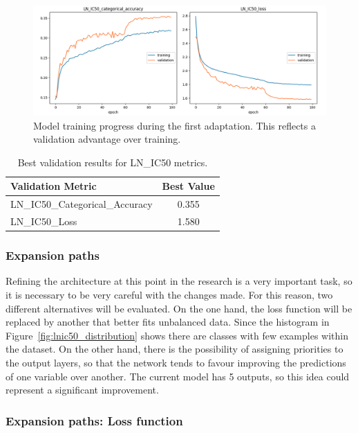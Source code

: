 \begin{figure}[H]
    \centering
    \includegraphics[width=1\textwidth]{figures/neural_net_classification/classification_mse_v1.png}
    \caption{Model training progress during the first adaptation. This reflects a validation advantage over training.}
    \label{fig:train_class_net_v1}
\end{figure}

\begin{table}[H]
    \centering
    \begin{tabular}{|l|c|}
    \hline
    \textbf{Validation Metric} & \textbf{Best Value} \\
    \hline
    LN\_IC50\_Categorical\_Accuracy & 0.355 \\
    LN\_IC50\_Loss & 1.580 \\
    \hline
    \end{tabular}
    \caption{Best validation results for LN\_IC50 metrics.}
    \label{tab:best_val_ln_ic50_metrics_net_class_v1}
\end{table}

\subsubsection{Expansion paths}

Refining the architecture at this point in the research is a very important task, so it is necessary to be very careful with the changes made. For this reason, two different alternatives will be evaluated. On the one hand, the loss function will be replaced by another that better fits unbalanced data. Since the histogram in Figure~\ref{fig:lnic50_distribution} shows there are classes with few examples within the dataset. On the other hand, there is the possibility of assigning priorities to the output layers, so that the network tends to favour improving the predictions of one variable over another. The current model has 5 outputs, so this idea could represent a significant improvement.

\subsubsection{Expansion paths: Loss function}

